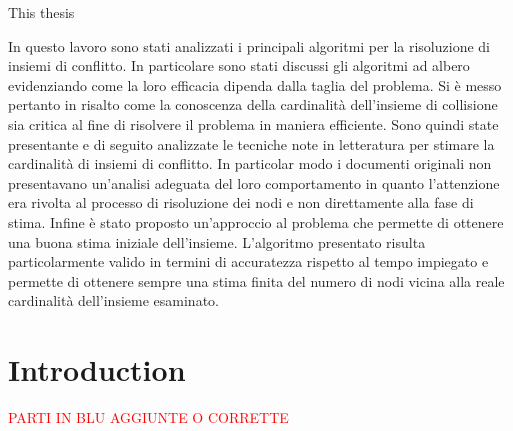 \documentclass[11pt,a4paper,twoside,openright]{book}
\newcommand{\fncyblank}{\fancyhf{}}
\newenvironment{abstract}%
{\cleardoublepage \fncyblank \null \vspace{\stretch{1}} \begin{center}%
\bfseries \abstractname \end{center}}%
{\vspace{\stretch{3}}\null}
\begin{document}
\begin{abstract}
This thesis
\end{abstract}
\begin{abstract}
\begin{singlespace}
In questo lavoro sono stati analizzati i principali algoritmi per la risoluzione di insiemi di conflitto. In particolare sono stati discussi gli algoritmi ad albero evidenziando come la loro efficacia dipenda dalla taglia del problema. Si è messo pertanto in risalto come la conoscenza della cardinalità dell'insieme di collisione sia critica al fine di  risolvere il problema in maniera efficiente. Sono quindi state presentante e di seguito analizzate le tecniche note in letteratura per stimare la cardinalità di insiemi di conflitto. In particolar modo i documenti originali non presentavano un'analisi adeguata del loro comportamento in quanto l'attenzione era rivolta al processo di risoluzione dei nodi e non direttamente alla fase di stima. Infine è stato proposto un'approccio al problema che permette di ottenere una buona stima iniziale dell'insieme. L'algoritmo presentato risulta particolarmente valido in termini di accuratezza rispetto al tempo impiegato e permette di ottenere sempre una stima finita del numero di nodi vicina alla reale cardinalità dell'insieme esaminato.
\end{singlespace}
\end{abstract}



\tableofcontents
\listoffigures
\listoftables

\mainmatter
\chapter{Introduction}
 
\textcolor{red}{PARTI IN BLU AGGIUNTE O CORRETTE}\\
\end{document}
